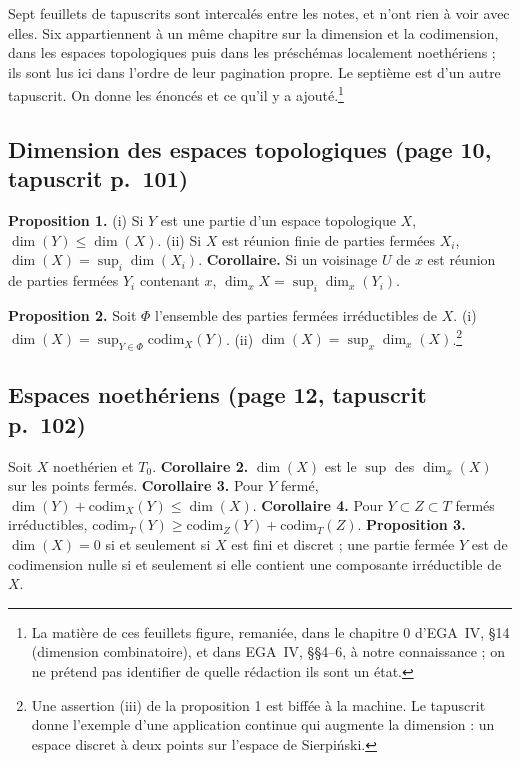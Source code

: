 \documentclass[11pt,a4paper]{article}
\begin{document}
Sept feuillets de tapuscrits sont intercalés entre les notes, et n'ont rien à
voir avec elles. Six appartiennent à un même chapitre sur la dimension et la
codimension, dans les espaces topologiques puis dans les préschémas localement
noethériens ; ils sont lus ici dans l'ordre de leur pagination propre. Le
septième est d'un autre tapuscrit. On donne les énoncés et ce qu'il y a
ajouté.\footnote{La matière de ces feuillets figure, remaniée, dans le chapitre
0 d'EGA~IV, §14 (dimension combinatoire), et dans EGA~IV, §§4--6, à notre
connaissance ; on ne prétend pas identifier de quelle rédaction ils sont un
état.}

\subsection*{Dimension des espaces topologiques (page 10, tapuscrit p.~101)}

\textbf{Proposition 1.} (i) Si $Y$ est une partie d'un espace topologique $X$,
$\dim(Y) \leq \dim(X)$. (ii) Si $X$ est réunion finie de parties fermées
$X_{i}$, $\dim(X) = \sup_{i} \dim(X_{i})$. \textbf{Corollaire.} Si un voisinage
$U$ de $x$ est réunion de parties fermées $Y_{i}$ contenant $x$,
$\dim_{x} X = \sup_{i} \dim_{x}(Y_{i})$.

\textbf{Proposition 2.} Soit $\Phi$ l'ensemble des parties fermées
irréductibles de $X$. (i) $\dim(X) = \sup_{Y \in \Phi} \mathrm{codim}_{X}(Y)$.
(ii) $\dim(X) = \sup_{x} \dim_{x}(X)$.\footnote{Une assertion (iii) de la
proposition 1 est biffée à la machine. Le tapuscrit donne l'exemple d'une
application continue qui augmente la dimension : un espace discret à deux
points sur l'espace de Sierpiński.}

\subsection*{Espaces noethériens (page 12, tapuscrit p.~102)}

Soit $X$ noethérien et $T_{0}$. \textbf{Corollaire 2.} $\dim(X)$ est le
$\sup$ des $\dim_{x}(X)$ sur les points fermés. \textbf{Corollaire 3.} Pour
$Y$ fermé, $\dim(Y) + \mathrm{codim}_{X}(Y) \leq \dim(X)$.
\textbf{Corollaire 4.} Pour $Y \subset Z \subset T$ fermés irréductibles,
$\mathrm{codim}_{T}(Y) \geq \mathrm{codim}_{Z}(Y) + \mathrm{codim}_{T}(Z)$.
\textbf{Proposition 3.} $\dim(X) = 0$ si et seulement si $X$ est fini et
discret ; une partie fermée $Y$ est de codimension nulle si et seulement si
elle contient une composante irréductible de $X$.
\end{document}
